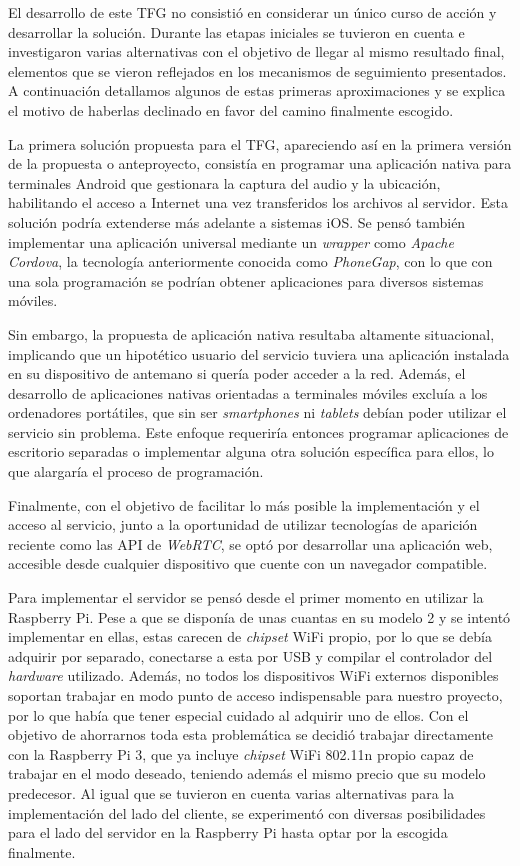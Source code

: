 \begin{appendices}
El desarrollo de este TFG no consistió en considerar un único curso de acción y desarrollar la solución. Durante las etapas iniciales se tuvieron en cuenta e investigaron varias alternativas con el objetivo de llegar al mismo resultado final, elementos que se vieron reflejados en los mecanismos de seguimiento presentados. A continuación detallamos algunos de estas primeras aproximaciones y se explica el motivo de haberlas declinado en favor del camino finalmente escogido.

La primera solución propuesta para el TFG, apareciendo así en la primera versión de la propuesta o anteproyecto, consistía en programar una aplicación nativa para terminales Android que gestionara la captura del audio y la ubicación, habilitando el acceso a Internet una vez transferidos los archivos al servidor. Esta solución podría extenderse más adelante a sistemas iOS. Se pensó también implementar una aplicación universal mediante un \emph{wrapper} como \emph{Apache Cordova}, la tecnología anteriormente conocida como \emph{PhoneGap}, con lo que con una sola programación se podrían obtener aplicaciones para diversos sistemas móviles.

Sin embargo, la propuesta de aplicación nativa resultaba altamente situacional, implicando que un hipotético usuario del servicio tuviera una aplicación instalada en su dispositivo de antemano si quería poder acceder a la red. Además, el desarrollo de aplicaciones nativas orientadas a terminales móviles excluía a los ordenadores portátiles, que sin ser \emph{smartphones} ni \emph{tablets} debían poder utilizar el servicio sin problema. Este enfoque requeriría entonces programar aplicaciones de escritorio separadas o implementar alguna otra solución específica para ellos, lo que alargaría el proceso de programación.

Finalmente, con el objetivo de facilitar lo más posible la implementación y el acceso al servicio, junto a la oportunidad de utilizar tecnologías de aparición reciente como las API de \emph{WebRTC}, se optó por desarrollar una aplicación web, accesible desde cualquier dispositivo que cuente con un navegador compatible.

Para implementar el servidor se pensó desde el primer momento en utilizar la Raspberry Pi. Pese a que se disponía de unas cuantas en su modelo 2 y se intentó implementar en ellas, estas carecen de \emph{chipset} WiFi propio, por lo que se debía adquirir por separado, conectarse a esta por USB y compilar el controlador del \emph{hardware} utilizado. Además, no todos los dispositivos WiFi externos disponibles soportan trabajar en modo punto de acceso indispensable para nuestro proyecto, por lo que había que tener especial cuidado al adquirir uno de ellos. Con el objetivo de ahorrarnos toda esta problemática se decidió trabajar directamente con la Raspberry Pi 3, que ya incluye \emph{chipset} WiFi 802.11n propio capaz de trabajar en el modo deseado, teniendo además el mismo precio que su modelo predecesor. Al igual que se tuvieron en cuenta varias alternativas para la implementación del lado del cliente, se experimentó con diversas posibilidades para el lado del servidor en la Raspberry Pi hasta optar por la escogida finalmente.


\end{appendices}
